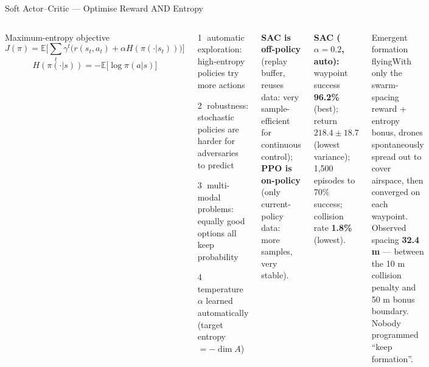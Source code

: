 \documentclass[aspectratio=169,10pt,t]{beamer}
\begin{document}
\begin{frame}{Soft Actor--Critic --- Optimise Reward AND Entropy}
\begin{columns}[T]
\begin{fbx}{Maximum-entropy objective}\[J(\pi)=\mathbb{E}\Big[\sum_t\gamma^{t}\big(r(s_t,a_t)+\alpha H(\pi(\cdot|s_t))\big)\Big]\]\[H(\pi(\cdot|s))=-\mathbb{E}\big[\log\pi(a|s)\big]\]\end{fbx}
\begin{tl}\item \textcircled{\tiny1} automatic exploration: high-entropy policies try more actions\item \textcircled{\tiny2} robustness: stochastic policies are harder for adversaries to predict\item \textcircled{\tiny3} multi-modal problems: equally good options all keep probability\item \textcircled{\tiny4} temperature $\alpha$ learned automatically (target entropy $=-\dim A$)\end{tl}
\begin{ibox}\scriptsize\textbf{SAC is off-policy} (replay buffer, reuses data: very sample-efficient for continuous control); \textbf{PPO is on-policy} (only current-policy data: more samples, very stable).\end{ibox}
\begin{rbox}\scriptsize\textbf{SAC ($\alpha=0.2$, auto):} waypoint success \textbf{96.2\%} (best); return $218.4\pm18.7$ (lowest variance); 1,500 episodes to 70\% success; collision rate \textbf{1.8\%} (lowest).\end{rbox}
\begin{cbox}[ISSAgrn]{Emergent formation flying}\scriptsize With only the swarm-spacing reward + entropy bonus, drones spontaneously spread out to cover airspace, then converged on each waypoint. Observed spacing \textbf{32.4 m} --- between the 10 m collision penalty and 50 m bonus boundary. Nobody programmed ``keep formation''.\end{cbox}
\end{columns}
\end{frame}
\end{document}
